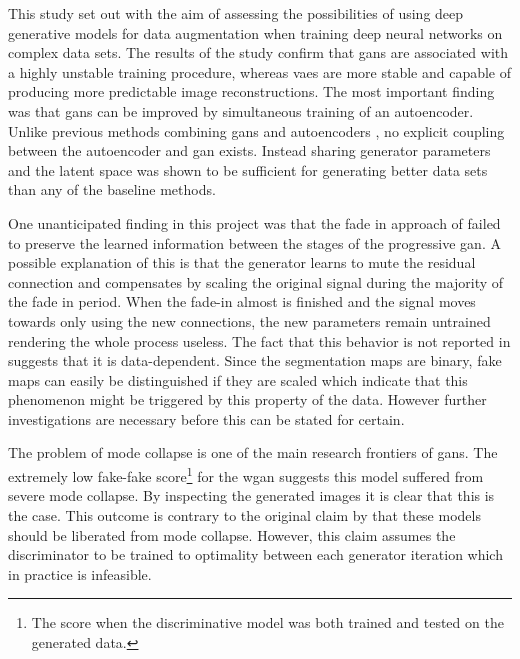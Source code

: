 This study set out with the aim of assessing the possibilities of using deep generative models for data augmentation when training deep neural networks on complex data sets. The results of the study confirm that \acrshort{gans} are associated with a highly unstable training procedure, whereas \acrshort{vaes} are more stable and capable of producing more predictable image reconstructions. The most important finding was that \acrshort{gans} can be improved by simultaneous training of an autoencoder. Unlike previous methods combining \acrshort{gans} and autoencoders \parencite{LarsenSW15autoencodingbeyond, nguyen2016plug, donahue2016adversarial, ulyanovVL17adversarial}, no explicit coupling between the autoencoder and \acrshort{gan} exists. Instead sharing generator parameters and the latent space was shown to be sufficient for generating better data sets than any of the baseline methods.

One unanticipated finding in this project was that the fade in approach of \textcite{karras2017progressive} failed to preserve the learned information between the stages of the progressive \acrshort{gan}. A possible explanation of this is that the generator learns to mute the residual connection and compensates by scaling the original signal during the majority of the fade in period. When the fade-in almost is finished and the signal moves towards only using the new connections, the new parameters remain untrained rendering the whole process useless. The fact that this behavior is not reported in \parencite{karras2017progressive} suggests that it is data-dependent. Since the segmentation maps are binary, fake maps can easily be distinguished if they are scaled which indicate that this phenomenon might be triggered by this property of the data. However further investigations are necessary before this can be stated for certain.

The problem of mode collapse is one of the main research frontiers of \acrshort{gans}. The extremely low fake-fake score\footnote{The score when the discriminative model was both trained and tested on the generated data.} for the \acrlong{wgan} suggests this model suffered from severe mode collapse. By inspecting the generated images it is clear that this is the case. This outcome is contrary to the original claim by \textcite{arjovsky2017wasserstein} that these models should be liberated from mode collapse. However, this claim assumes the discriminator to be trained to optimality between each generator iteration which in practice is infeasible. 

